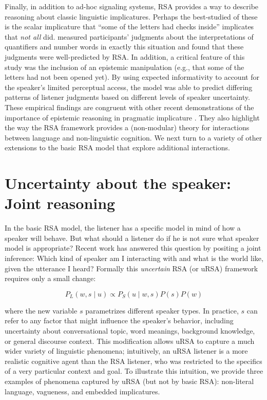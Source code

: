 \documentclass[]{elsarticle}
\begin{document}
Finally, in addition to ad-hoc signaling systems, RSA provides a way to describe reasoning about classic linguistic
implicatures. Perhaps the
best-studied of these is the scalar implicature that ``some of the
letters had checks inside'' implicates that \emph{not all} did. \citet{goodman2013} measured participants' judgments about the
interpretations of quantifiers and number words in exactly this
situation and found that these judgments were well-predicted by RSA. In
addition, a critical feature of this study was the inclusion of an
epistemic manipulation (e.g., that some of the letters had not been opened
yet). By using expected informativity to account for the speaker's
limited perceptual access, the model was able to predict
differing patterns of listener judgments based on different levels of
speaker uncertainty. These empirical findings are congruent with other recent
demonstrations of the importance of epistemic reasoning in pragmatic
implicature \citep[e.g.,]{bergen2012,breheny2013}. They
also highlight the way the RSA framework provides a (non-modular) theory
for interactions between language and non-linguistic cognition. 
We next turn to a variety of other extensions to the basic RSA model that explore additional interactions.

\section{Uncertainty about the speaker: Joint reasoning}\label{uncertainty-about-the-speaker-joint-reasoning}

In the basic RSA model, the listener has a specific model in mind of how
a speaker will behave. But what should a listener do if he is not sure
what speaker model is appropriate? Recent work has answered this
question by positing a joint inference: Which kind of speaker am I
interacting with and what is the world like, given the utterance I
heard? Formally this \emph{uncertain} RSA (or uRSA) framework requires
only a small change:

$$P_L(w,s\mid u) \propto
P_S(u\mid w,s)P(s)P(w)$$

where the new variable $s$ parametrizes different speaker types. In practice, $s$ can
refer to any factor that might influence the speaker's behavior,
including uncertainty about conversational topic, word
meanings, background knowledge, or general discourse context.
This modification allows uRSA to capture a much wider variety of
linguistic phenomena; intuitively, an uRSA listener is a more realistic
cognitive agent than the RSA listener, who was restricted to the
specifics of a very particular context and goal. To illustrate this
intuition, we provide three examples of phenomena captured by uRSA (but not by basic RSA): non-literal language, vagueness, and embedded implicatures.
\end{document}
